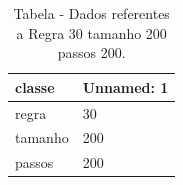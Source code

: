\begin{table}[H]
\centering
\caption{Tabela - Dados referentes a Regra 30 tamanho 200 passos 200.}
\label{tab:regra_30_tamanho_200_passos_200}
\begin{tabular}{ll}
\toprule
classe & Unnamed: 1 \\
\midrule
regra & 30 \\
tamanho & 200 \\
passos & 200 \\
\bottomrule
\end{tabular}

\end{table}
